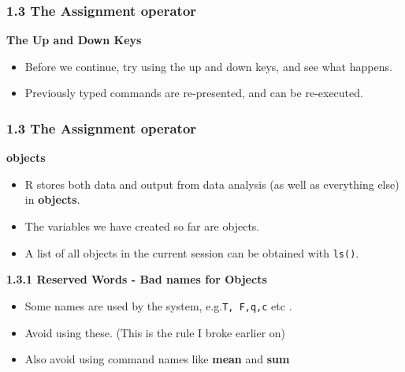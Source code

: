 \documentclass{beamer}
\begin{document}
 	\begin{frame}
 		\frametitle{1.3 The Assignment operator}
 		\textbf{The Up and Down Keys}
 		\begin{itemize}
 			\item Before we continue, try using the up and down keys, and see what happens. 
 			\item Previously
 			typed commands are re-presented, and can be re-executed.
 		\end{itemize}
 		
 	\end{frame}
 	\begin{frame}
 		\frametitle{1.3 The Assignment operator }
 		\textbf{objects}
 		\begin{itemize}
 			\item R stores both data and output from data analysis (as well as everything else) in \textbf{objects}.
 			\item The variables we have created so far are objects. 
 			\item A list of all objects in the current session can
 			be obtained with \texttt{ls()}.
 		\end{itemize}
 	\end{frame}
 	\textbf{1.3.1 Reserved Words - Bad names for Objects}
 	\begin{itemize}
 		\item Some names are used by the system, e.g.\texttt{T, F,q,c} etc . 
 		\item Avoid using these. (This is the rule I broke earlier on)
 		\item Also avoid using command names like \textbf{mean} and \textbf{sum}
 	\end{itemize}
 	
 	
  
\end{document}
